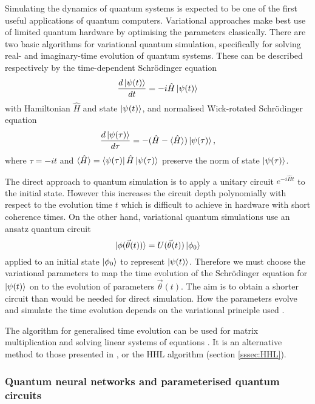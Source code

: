 \documentclass[10pt]{iopart}
\begin{document}
Simulating the dynamics of quantum systems is expected to be one of the first useful applications of quantum computers.  Variational approaches make best use of limited quantum hardware by optimising the parameters classically. There are two basic algorithms for variational quantum simulation, specifically for solving real- and imaginary-time evolution of quantum systems. These can be described respectively by the time-dependent Schr{\"o}dinger equation
\begin{equation}
\frac{d\ket{\psi(t)}}{dt} = -i\hat{H} \ket{\psi(t)}
\end{equation}
with Hamiltonian $\hat{H}$ and state $\ket{\psi(t)}$, and normalised Wick-rotated Schr{\"o}dinger equation
\begin{equation}
\frac{d\ket{\psi(\tau)}}{d\tau} = -(\hat{H} - \braket{\hat{H}}) \ket{\psi(\tau)}, 
\end{equation}
where $\tau=-it$ and $\braket{\hat{H}} = \bra{\psi(\tau)} \hat{H} \ket{\psi(\tau)}$ preserve the norm of state $\ket{\psi(\tau)}$.

The direct approach to quantum simulation is to apply a unitary circuit $e^{-i\hat{H}t}$ to the initial state. However this increases the circuit depth polynomially with respect to the evolution time $t$ \cite{low2019hamiltonian} which is difficult to achieve in hardware with short coherence times. On the other hand, variational quantum simulations use an ansatz quantum circuit
\begin{equation}
\ket{\phi(\vec{\theta}(t))} = U(\vec{\theta}(t)) \ket{\phi_0}
\end{equation}
applied to an initial state $\ket{\phi_0}$ to represent $\ket{\psi(t)}$. 
Therefore we must choose the variational parameters to map the time evolution of the Schr{\"o}dinger equation for $\ket{\psi(t)}$ on to the evolution of parameters $\vec{\theta}(t)$. The aim is to obtain a shorter circuit than would be needed for direct simulation. How the parameters evolve and simulate the time evolution depends on the variational principle used \cite{Yuan2019}. 

The algorithm for generalised time evolution can be used for matrix multiplication and solving linear systems of equations \cite{Endo2020}. It is an alternative method to those presented in \cite{BravoPrieto2020,Xu2021v}, or the HHL algorithm (section \ref{sssec:HHL}). 


\subsubsection{Quantum neural networks and parameterised quantum circuits}\hfill
\end{document}
